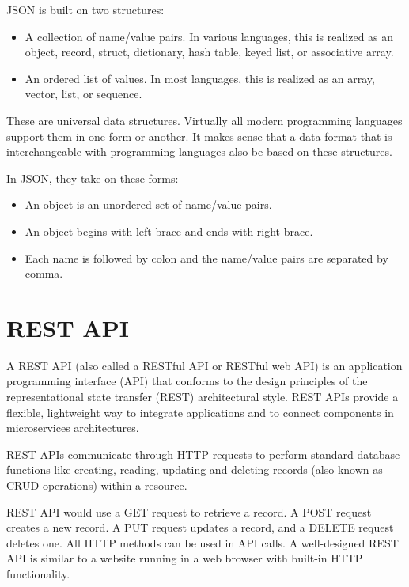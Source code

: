 	JSON is built on two structures:

	\begin{itemize}
		\item A collection of name/value pairs. In various languages, this is realized as an object, record, struct, dictionary, hash table, 
		keyed list, or associative array.
		\item An ordered list of values. In most languages, this is realized as an array, vector, list, or sequence.
	\end{itemize}

	These are universal data structures. Virtually all modern programming languages support them in one form or another. 
	It makes sense that a data format that is interchangeable with programming languages also be based on these structures.

	In JSON, they take on these forms:

	\begin{itemize}
		\item An object is an unordered set of name/value pairs.
		\item An object begins with left brace and ends with right brace.
		\item Each name is followed by colon and the name/value pairs are separated by comma.
	\end{itemize}

\section{REST API}
	A REST API \cite{restapi} (also called a RESTful API or RESTful web API) is an application programming interface (API) that conforms to the design principles of 
	the representational state transfer (REST) architectural style. REST APIs provide a flexible, lightweight way to integrate applications and to connect 
	components in microservices architectures.

	REST APIs communicate through HTTP requests to perform standard database functions like creating, reading,
	updating and deleting records (also known as CRUD operations) within a resource.

	REST API would use a GET request to retrieve a record. A POST request creates a new record. A PUT request updates a record, and a DELETE request deletes one. 
	All HTTP methods can be used in API calls. A well-designed REST API is similar to a website running in a web browser with built-in HTTP functionality.

